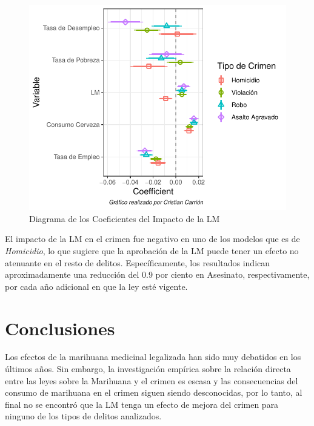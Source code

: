 \documentclass[11pt,]{article}
\begin{document}
\begin{figure}
\centering
\includegraphics{mar_doc_files/figure-latex/graph3-1.pdf}
\caption{\label{fig:plot3} Diagrama de los Coeficientes del Impacto de
la LM}
\end{figure}

\newpage

El impacto de la LM en el crimen fue negativo en uno de los modelos que
es de \emph{Homicidio}, lo que sugiere que la aprobación de la LM puede
tener un efecto no atenuante en el resto de delitos. Específicamente,
los resultados indican aproximadamente una reducción del 0.9 por ciento
en Asesinato, respectivamente, por cada año adicional en que la ley esté
vigente.

\hypertarget{conclusiones}{%
\section{Conclusiones}\label{conclusiones}}

Los efectos de la marihuana medicinal legalizada han sido muy debatidos
en los últimos años. Sin embargo, la investigación empírica sobre la
relación directa entre las leyes sobre la Marihuana y el crimen es
escasa y las consecuencias del consumo de marihuana en el crimen siguen
siendo desconocidas, por lo tanto, al final no se encontró que la LM
tenga un efecto de mejora del crimen para ninguno de los tipos de
delitos analizados.
\end{document}

